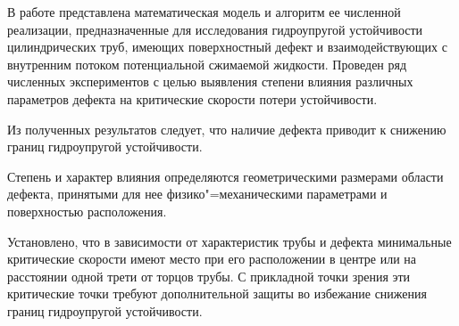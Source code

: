 
В работе представлена математическая модель и алгоритм ее численной реализации, предназначенные для исследования гидроупругой устойчивости цилиндрических труб, имеющих поверхностный дефект и взаимодействующих с внутренним потоком потенциальной сжимаемой жидкости. Проведен ряд численных экспериментов с целью выявления степени влияния различных параметров дефекта на критические скорости потери устойчивости. 

Из полученных результатов следует, что наличие дефекта приводит к снижению границ гидроупругой устойчивости. 

Степень и характер влияния определяются геометрическими размерами области дефекта, принятыми для нее физико"=механическими параметрами и поверхностью расположения. 

Установлено, что в зависимости от характеристик трубы и дефекта минимальные критические скорости имеют место при его расположении в центре или на расстоянии одной трети от торцов трубы. С прикладной точки зрения эти критические точки требуют дополнительной защиты во избежание снижения границ гидроупругой устойчивости.






















